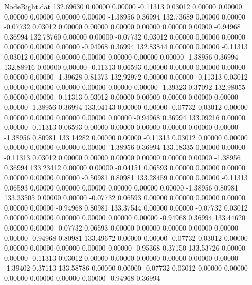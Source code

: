\begin{filecontents}{NodeRight.dat}
 132.69630    0.00000    0.00000    -0.11313    0.03012    0.00000    0.00000    0.00000    0.00000    0.00000    0.00000   -1.38956    0.36994
 132.73689    0.00000    0.00000    -0.07732    0.03012    0.00000    0.00000    0.00000    0.00000    0.00000    0.00000   -0.94968    0.36994
 132.78760    0.00000    0.00000    -0.07732    0.03012    0.00000    0.00000    0.00000    0.00000    0.00000    0.00000   -0.94968    0.36994
 132.83844    0.00000    0.00000    -0.11313    0.03012    0.00000    0.00000    0.00000    0.00000    0.00000    0.00000   -1.38956    0.36994
 132.88916    0.00000    0.00000    -0.11313    0.06593    0.00000    0.00000    0.00000    0.00000    0.00000    0.00000   -1.39628    0.81373
 132.92972    0.00000    0.00000    -0.11313    0.03012    0.00000    0.00000    0.00000    0.00000    0.00000    0.00000   -1.39323    0.37092
 132.98055    0.00000    0.00000    -0.11313    0.03012    0.00000    0.00000    0.00000    0.00000    0.00000    0.00000   -1.38956    0.36994
 133.04143    0.00000    0.00000    -0.07732    0.03012    0.00000    0.00000    0.00000    0.00000    0.00000    0.00000   -0.94968    0.36994
 133.09216    0.00000    0.00000    -0.11313    0.06593    0.00000    0.00000    0.00000    0.00000    0.00000    0.00000   -1.38956    0.80981
 133.14282    0.00000    0.00000    -0.11313    0.03012    0.00000    0.00000    0.00000    0.00000    0.00000    0.00000   -1.38956    0.36994
 133.18335    0.00000    0.00000    -0.11313    0.03012    0.00000    0.00000    0.00000    0.00000    0.00000    0.00000   -1.38956    0.36994
 133.23412    0.00000    0.00000    -0.04151    0.06593    0.00000    0.00000    0.00000    0.00000    0.00000    0.00000   -0.50981    0.80981
 133.28459    0.00000    0.00000    -0.11313    0.06593    0.00000    0.00000    0.00000    0.00000    0.00000    0.00000   -1.38956    0.80981
 133.33505    0.00000    0.00000    -0.07732    0.06593    0.00000    0.00000    0.00000    0.00000    0.00000    0.00000   -0.94968    0.80981
 133.37544    0.00000    0.00000    -0.07732    0.03012    0.00000    0.00000    0.00000    0.00000    0.00000    0.00000   -0.94968    0.36994
 133.44620    0.00000    0.00000    -0.07732    0.06593    0.00000    0.00000    0.00000    0.00000    0.00000    0.00000   -0.94968    0.80981
 133.49672    0.00000    0.00000    -0.07732    0.03012    0.00000    0.00000    0.00000    0.00000    0.00000    0.00000   -0.95368    0.37150
 133.53726    0.00000    0.00000    -0.11313    0.03012    0.00000    0.00000    0.00000    0.00000    0.00000    0.00000   -1.39402    0.37113
 133.58786    0.00000    0.00000    -0.07732    0.03012    0.00000    0.00000    0.00000    0.00000    0.00000    0.00000   -0.94968    0.36994

\end{filecontents}
